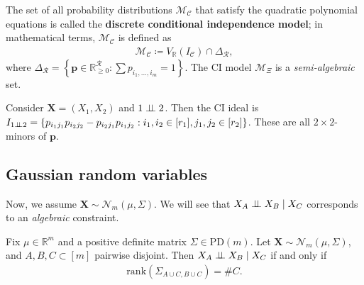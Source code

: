 \begin{defi}
  The set of all probability distributions \( \mathcal{M}_{\mathcal{C}} \) that satisfy the quadratic polynomial equations is called the \textbf{discrete conditional independence model}; in mathematical terms,  \( \mathcal{M}_{\mathcal{C}} \) is defined as
  \begin{align*}
    \mathcal{M}_{\mathcal{C}} \coloneqq V_{\mathbb R}(I_{\mathcal{C}}) \cap \Delta_{\mathcal{R}},
  \end{align*}
  where \( \Delta_{\mathcal{R}} = \left\{ \mathbf p \in \mathbb{R}_{\geq 0}^{\mathcal R} : \sum p_{i_1,...,i_m} = 1\right\} \). The CI model \( \mathcal{M}_\Xi \) is a \emph{semi-algebraic} set.
\end{defi}

\begin{eg}
  Consider \( \mathbf X = (X_1, X_2) \) and \( 1 \perp \!\!\! \perp 2 \). Then the CI ideal is \( I_{1 \perp \!\!\! \perp 2} = \left\{ p_{i_1j_1}p_{i_2j_2} - p_{i_2j_1}p_{i_1j_2} : i_1,i_2 \in [r_1], j_1,j_2 \in [r_2]\right\} \). These are all \( 2 \times 2 \)-minors of \( \mathbf p \).
\end{eg}

\subsection{Gaussian random variables}

Now, we assume \( \mathbf X \sim \mathcal{N}_m(\mu, \Sigma) \). We will see that \( X_A \perp \!\!\! \perp X_B \mid X_C \) corresponds to an \emph{algebraic} constraint.

\begin{mdframed}  
\begin{prop}
  Fix \( \mu \in \mathbb R^m \) and a positive definite matrix \( \Sigma \in \mathrm{PD}(m) \).
  Let \( \mathbf X \sim \mathcal{N}_m(\mu, \Sigma) \), and \( A, B, C \subset [m] \) pairwise disjoint. Then \( X_A \perp \!\!\! \perp X_B \mid X_C \) if and only if 
  \begin{align*}
    \mathrm{rank}(\Sigma_{A \cup C, B \cup C}) = \# C.
  \end{align*}
\end{prop}
\end{mdframed}


